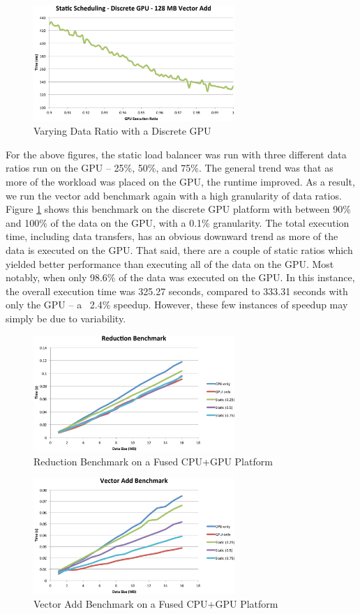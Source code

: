 \documentclass[journal]{IEEEtran}
\begin{document}
\begin{figure}[t]
\centering
\includegraphics[width=3.0in]{static_discrete}
\caption{Varying Data Ratio with a Discrete GPU}
\label{fig:static_discrete}
\end{figure}

For the above figures, the static load balancer was run with three different
data ratios run on the GPU -- 25\%, 50\%, and 75\%.  The general trend was that
as more of the workload was placed on the GPU, the runtime improved.  As a
result, we run the vector add benchmark again with a high granularity of data
ratios.  Figure \ref{fig:static_discrete} shows  this benchmark on the discrete
GPU platform with between 90\% and 100\% of the data on the GPU, with a 0.1\%
granularity.  The total execution time, including data transfers, has an
obvious downward trend as more of the data is executed on the GPU.  That said,
there are a couple of static ratios which yielded better performance than
executing all of the data on the GPU.  Most notably, when only 98.6\% of the
data was executed on the GPU.  In this instance, the overall execution time was
325.27 seconds, compared to 333.31 seconds with only the GPU -- a ~2.4\%
speedup.  However, these few instances of speedup may simply be due to variability.

\begin{figure}[t]
\centering
\includegraphics[width=3.0in]{reduce_fused}
\caption{Reduction Benchmark on a Fused CPU+GPU Platform}
\label{fig:reduce_fused}
\end{figure}

\begin{figure}[t]
\centering
\includegraphics[width=3.0in]{vector_fused}
\caption{Vector Add Benchmark on a Fused CPU+GPU Platform}
\label{fig:vector_fused}
\end{figure}
\end{document}
